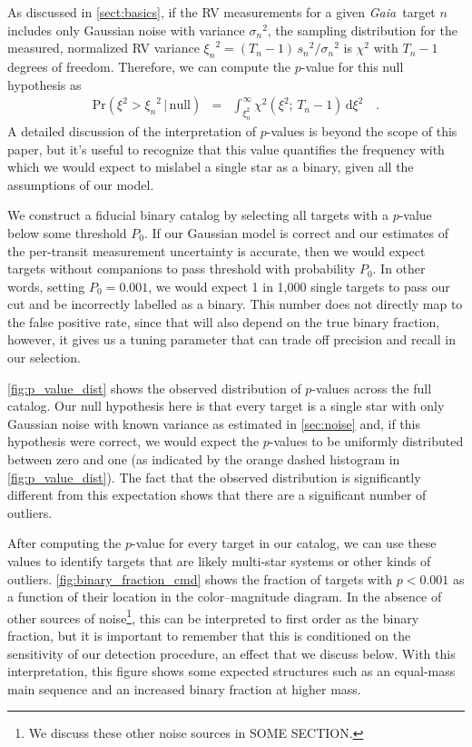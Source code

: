 \documentclass[modern, letterpaper]{aastex631}
\newcommand{\project}[1]{\textsl{#1}}
\newcommand{\Gaia}{\project{Gaia}}
\newcommand{\dd}{\ensuremath{\,\mathrm{d}}}
\begin{document}
As discussed in \autoref{sect:basics}, if the RV measurements for a given \Gaia\ target $n$ includes only Gaussian noise with variance ${\sigma_n}^2$, the sampling distribution for the measured, normalized RV variance ${\xi_n}^2 = (T_n - 1)\,{s_n}^2 / {\sigma_n}^2$ is $\chi^2$ with $T_n - 1$ degrees of freedom.
Therefore, we can compute the $p$-value for this null hypothesis as
\begin{eqnarray}
	\mathrm{Pr}(\xi^2 > {\xi_n}^2\,|\,\mathrm{null}) &=& \int_{\xi_n^2}^\infty \chi^2 (\xi^2;\,T_n-1) \dd \xi^2 \quad.
\end{eqnarray}
A detailed discussion of the interpretation of $p$-values is beyond the scope of this paper, but it's useful to recognize that this value quantifies the frequency with which we would expect to mislabel a single star as a binary, given all the assumptions of our model.

We construct a fiducial binary catalog by selecting all targets with a $p$-value below some threshold $P_0$.
If our Gaussian model is correct and our estimates of the per-transit measurement uncertainty is accurate, then we would expect targets without companions to pass threshold with probability $P_0$.
In other words, setting $P_0 = 0.001$, we would expect 1 in 1,000 single targets to pass our cut and be incorrectly labelled as a binary.
This number does not directly map to the false positive rate, since that will also depend on the true binary fraction, however, it gives us a tuning parameter that can trade off precision and recall in our selection.

\autoref{fig:p_value_dist} shows the observed distribution of $p$-values across the full catalog.
Our null hypothesis here is that every target is a single star with only Gaussian noise with known variance as estimated in \autoref{sec:noise} and, if this hypothesis were correct, we would expect the $p$-values to be uniformly distributed between zero and one (as indicated by the orange dashed histogram in \autoref{fig:p_value_dist}).
The fact that the observed distribution is significantly different from this expectation shows that there are a significant number of outliers.

After computing the $p$-value for every target in our catalog, we can use these values to identify targets that are likely multi-star systems or other kinds of outliers.
\autoref{fig:binary_fraction_cmd} shows the fraction of targets with $p < 0.001$ as a function of their location in the color--magnitude diagram.
In the absence of other sources of noise\footnote{We discuss these other noise sources in SOME SECTION.}, this can be interpreted to first order as the binary fraction, but it is important to remember that this is conditioned on the sensitivity of our detection procedure, an effect that we discuss below.
With this interpretation, this figure shows some expected structures such as an equal-mass main sequence and an increased binary fraction at higher mass.
\end{document}
